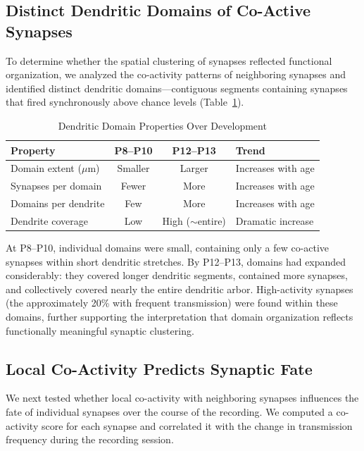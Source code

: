 \documentclass[11pt]{article}
\begin{document}
\subsection{Distinct Dendritic Domains of Co-Active Synapses}

To determine whether the spatial clustering of synapses reflected functional organization, we analyzed the co-activity patterns of neighboring synapses and identified distinct dendritic domains---contiguous segments containing synapses that fired synchronously above chance levels (Table~\ref{tab:domains}).

\begin{table}[ht]
\centering
\caption{Dendritic Domain Properties Over Development}
\label{tab:domains}
\begin{tabular}{lccl}
\toprule
\textbf{Property} & \textbf{P8--P10} & \textbf{P12--P13} & \textbf{Trend} \\
\midrule
Domain extent ($\mu$m) & Smaller & Larger & Increases with age \\
Synapses per domain & Fewer & More & Increases with age \\
Domains per dendrite & Few & More & Increases with age \\
Dendrite coverage & Low & High ($\sim$entire) & Dramatic increase \\
\bottomrule
\end{tabular}
\end{table}

At P8--P10, individual domains were small, containing only a few co-active synapses within short dendritic stretches. By P12--P13, domains had expanded considerably: they covered longer dendritic segments, contained more synapses, and collectively covered nearly the entire dendritic arbor. High-activity synapses (the approximately 20\% with frequent transmission) were found within these domains, further supporting the interpretation that domain organization reflects functionally meaningful synaptic clustering.

\subsection{Local Co-Activity Predicts Synaptic Fate}

We next tested whether local co-activity with neighboring synapses influences the fate of individual synapses over the course of the recording. We computed a co-activity score for each synapse and correlated it with the change in transmission frequency during the recording session.
\end{document}

